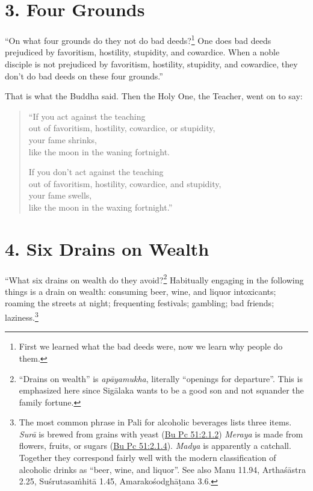 \documentclass[12pt,openany]{book}%
\begin{document}
\section*{3. Four Grounds }

“On what four grounds do they not do bad deeds?\footnote{First we learned what the bad deeds were, now we learn why people do them. } One does bad deeds prejudiced by favoritism, hostility, stupidity, and cowardice. When a noble disciple is not prejudiced by favoritism, hostility, stupidity, and cowardice, they don’t do bad deeds on these four grounds.” 

That is what the Buddha said. Then the Holy One, the Teacher, went on to say: 

\begin{verse}%
“If you act against the teaching \\
out of favoritism, hostility, cowardice, or stupidity, \\
your fame shrinks, \\
like the moon in the waning fortnight. 

If you don’t act against the teaching \\
out of favoritism, hostility, cowardice, and stupidity, \\
your fame swells, \\
like the moon in the waxing fortnight.” 

%
\end{verse}

\section*{4. Six Drains on Wealth }

“What six drains on wealth do they avoid?\footnote{“Drains on wealth” is \textit{\textsanskrit{apāyamukha}}, literally “openings for departure”. This is emphasized here since \textsanskrit{Sigālaka} wants to be a good son and not squander the family fortune. } Habitually engaging in the following things is a drain on wealth: consuming beer, wine, and liquor intoxicants; roaming the streets at night; frequenting festivals; gambling; bad friends; laziness.\footnote{The most common phrase in Pali for alcoholic beverages lists three items. \textit{\textsanskrit{Surā}} is brewed from grains with yeast (\href{https://suttacentral.net/pli-tv-bu-vb-pc51/en/sujato\#2.1.2}{Bu Pc 51:2.1.2}) \textit{Meraya} is made from flowers, fruits, or sugars (\href{https://suttacentral.net/pli-tv-bu-vb-pc51/en/sujato\#2.1.4}{Bu Pc 51:2.1.4}). \textit{Madya} is apparently a catchall. Together they correspond fairly well with the modern classification of alcoholic drinks as “beer, wine, and liquor”. See also Manu 11.94, \textsanskrit{Arthaśāstra} 2.25, \textsanskrit{Suśrutasaṁhitā} 1.45, \textsanskrit{Amarakośodghāṭana} 3.6. } 
\end{document}
